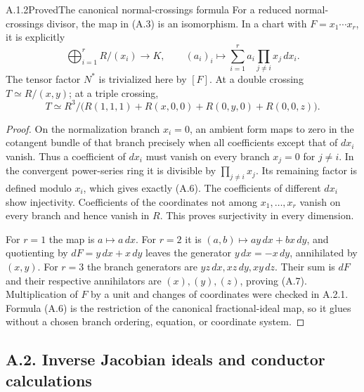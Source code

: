\begin{statement}{A.1.2}{Proved}{The canonical normal-crossings formula}
For a reduced normal-crossings divisor, the map in (A.3) is an isomorphism. In a chart with $F=x_1\cdots x_r$, it is explicitly
\[
 \bigoplus_{i=1}^r R/(x_i)\longrightarrow K,
 \qquad (a_i)_i\longmapsto
 \sum_{i=1}^r a_i\prod_{j\ne i}x_j\,dx_i.
\tag{A.6}
\]
The tensor factor $N^*$ is trivialized here by $[F]$. At a double crossing $T\simeq R/(x,y)$; at a triple crossing,
\[
 T\simeq R^3/\bigl(R(1,1,1)+R(x,0,0)+R(0,y,0)+R(0,0,z)\bigr).
\tag{A.7}
\]
\end{statement}
\begin{proof}
On the normalization branch $x_i=0$, an ambient form maps to zero in the cotangent bundle of that branch precisely when all coefficients except that of $dx_i$ vanish. Thus a coefficient of $dx_i$ must vanish on every branch $x_j=0$ for $j\ne i$. In the convergent power-series ring it is divisible by $\prod_{j\ne i}x_j$. Its remaining factor is defined modulo $x_i$, which gives exactly (A.6). The coefficients of different $dx_i$ show injectivity. Coefficients of the coordinates not among $x_1,\ldots,x_r$ vanish on every branch and hence vanish in $R$. This proves surjectivity in every dimension.

For $r=1$ the map is $a\mapsto a\,dx$. For $r=2$ it is $(a,b)\mapsto ay\,dx+bx\,dy$, and quotienting by $dF=y\,dx+x\,dy$ leaves the generator $y\,dx=-x\,dy$, annihilated by $(x,y)$. For $r=3$ the branch generators are $yz\,dx,xz\,dy,xy\,dz$. Their sum is $dF$ and their respective annihilators are $(x),(y),(z)$, proving (A.7). Multiplication of $F$ by a unit and changes of coordinates were checked in A.2.1. Formula (A.6) is the restriction of the canonical fractional-ideal map, so it glues without a chosen branch ordering, equation, or coordinate system.
\end{proof}


\subsection{A.2. Inverse Jacobian ideals and conductor calculations}


